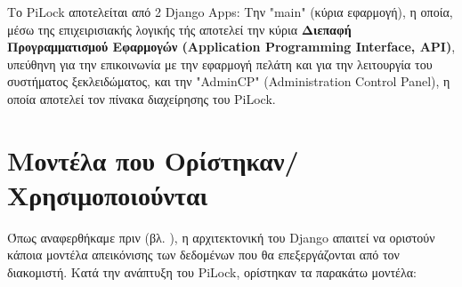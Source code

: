 	Το PiLock αποτελείται από 2 Django Apps: Την "main" (κύρια εφαρμογή), η οποία, μέσω της επιχειρισιακής λογικής τής αποτελεί την κύρια \textbf{Διεπαφή Προγραμματισμού Εφαρμογών (Application Programming Interface, API)}, υπεύθηνη για την επικοινωνία με την εφαρμογή πελάτη και για την λειτουργία του συστήματος ξεκλειδώματος, και την "AdminCP" (Administration Control Panel), η οποία αποτελεί τον πίνακα διαχείρησης του PiLock.

\section{Μοντέλα που Ορίστηκαν/Χρησιμοποιούνται}
	Όπως αναφερθήκαμε πριν (βλ. ), η αρχιτεκτονική του Django απαιτεί να οριστούν κάποια μοντέλα απεικόνισης των δεδομένων που θα επεξεργάζονται από τον διακομιστή. Κατά την ανάπτυξη του PiLock, ορίστηκαν τα παρακάτω μοντέλα:


